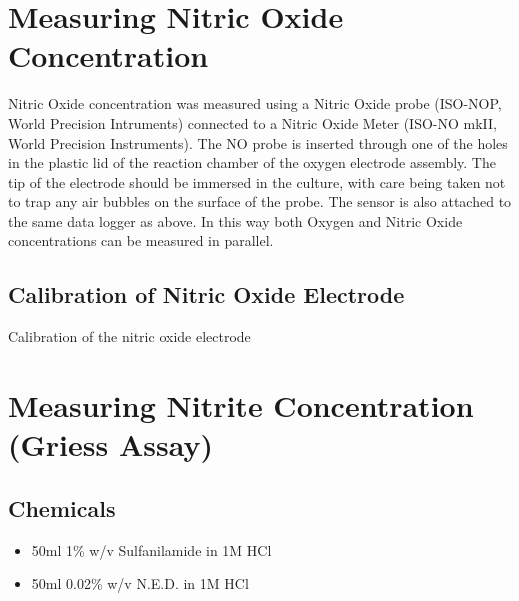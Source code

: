 \section{Measuring Nitric Oxide Concentration}
Nitric Oxide concentration was measured using a Nitric Oxide probe (ISO-NOP, World Precision Intruments) connected to a Nitric Oxide Meter (ISO-NO mkII, World Precision Instruments). The NO probe is inserted through one of the holes in the plastic lid of the reaction chamber of the oxygen electrode assembly. The tip of the electrode should be immersed in the culture, with care being taken not to trap any air bubbles on the surface of the probe. The sensor is also attached to the same data logger as above. In this way both Oxygen and Nitric Oxide concentrations can be measured in parallel.
\subsection{Calibration of Nitric Oxide Electrode}
Calibration of the nitric oxide electrode 

\section{Measuring Nitrite Concentration (Griess Assay)}
\cite{DonaldNicholas1957}
\subsection*{Chemicals}
\begin{itemize}
 \item 50ml 1\% w/v Sulfanilamide in 1M HCl
 \item 50ml 0.02\% w/v N.E.D. in 1M HCl
\end{itemize}


